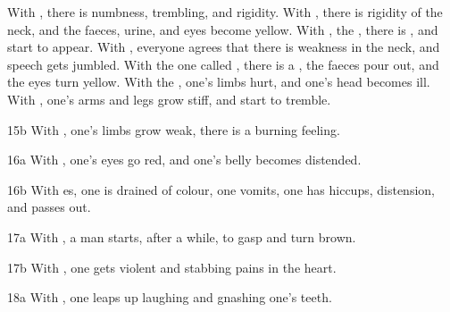 \begin{translation}
    With
    , there is numbness,
    trembling, and rigidity.
%
    With
    , there is rigidity of the neck, and the faeces,
    urine, and eyes become yellow.
    With
    , the , there is , and
     start to appear.
    With
    , everyone agrees that there is weakness in the neck, and speech gets
    jumbled.
    With the one called
    ,
    there is a , the faeces pour out, and  the eyes
    turn yellow.
    With the
    ,
    one's limbs hurt, and one's head becomes ill.
    With
    ,
    one's arms and legs grow stiff, and start to tremble.
    \item[ 15b]
    With
    , one's limbs grow weak, there is a burning
    feeling.
    \item[ 16a]
    With
    ,
    one's eyes go red, and one's belly becomes distended.
    \item[ 16b]
    With
    es,
    one is drained of colour, one vomits, one has hiccups, distension, and
    passes out.
    \item[ 17a]
    With
    , a man starts, after a while, to gasp and
    turn brown.
    \item[ 17b]
    With
    ,
    one gets violent  and stabbing pains in the heart.
    \item[ 18a]
    With
    ,
    one leaps up laughing and gnashing one's teeth.
    

\end{translation}
